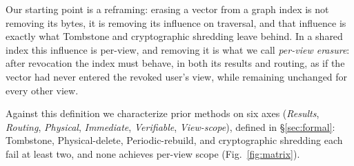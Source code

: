 \documentclass[sigconf, nonacm, review]{acmart}
\begin{document}
Our starting point is a reframing: erasing a vector from a graph index is
not removing its bytes, it is removing its influence on traversal, and
that influence is exactly what Tombstone and cryptographic shredding leave
behind. In a shared index this influence is per-view, and removing it is what we
call \emph{per-view erasure}: after revocation the index must behave, in
both its results and routing, as if the vector had never entered the
revoked user's view, while remaining unchanged for every other view.

Against this definition we
characterize prior methods on six axes (\emph{Results}, \emph{Routing},
\emph{Physical}, \emph{Immediate}, \emph{Verifiable}, \emph{View-scope}),
defined in \S\ref{sec:formal}: Tombstone, Physical-delete,
Periodic-rebuild, and cryptographic shredding each fail at least
two, and none achieves per-view scope (Fig.~\ref{fig:matrix}).
\end{document}
